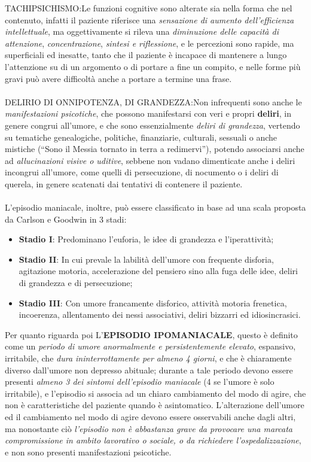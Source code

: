 \begin{itemize}
TACHIPSICHISMO:Le funzioni cognitive sono alterate sia nella forma che
nel contenuto, infatti il paziente riferisce una \emph{sensazione di
aumento dell'efficienza intellettuale}, ma oggettivamente si rileva una
\emph{diminuzione delle capacità di attenzione}, \emph{concentrazione},
\emph{sintesi e riflessione}, e le percezioni sono rapide, ma
superficiali ed inesatte, tanto che il paziente è incapace di mantenere
a lungo l'attenzione su di un argomento o di portare a fine un compito,
e nelle forme più gravi può avere difficoltà anche a portare a termine
una frase.
\\\\
DELIRIO DI ONNIPOTENZA, DI GRANDEZZA:Non infrequenti sono anche le
\emph{manifestazioni psicotiche}, che possono manifestarsi con veri e
propri \textbf{deliri}, in genere congrui all'umore, e che sono
essenzialmente \emph{deliri di grandezza}, vertendo su tematiche
genealogiche, politiche, finanziarie, culturali, sessuali o anche
mistiche (``Sono il Messia tornato in terra a redimervi''), potendo
associarsi anche ad \emph{allucinazioni visive o uditive}, sebbene non
vadano dimenticate anche i deliri incongrui all'umore, come quelli di
persecuzione, di nocumento o i deliri di querela, in genere scatenati
dai tentativi di contenere il paziente.
\\\\
L'episodio maniacale, inoltre, può essere classificato in base ad una
scala proposta da Carlson e Goodwin in 3 stadi:

\begin{itemize}
\item \textbf{Stadio I}: Predominano l'euforia, le idee di grandezza e l'iperattività;

\item \textbf{Stadio II}: In cui prevale la labilità dell'umore con frequente
disforia, agitazione motoria, accelerazione del pensiero sino alla fuga
delle idee, deliri di grandezza e di persecuzione;

\item \textbf{Stadio III}: Con umore francamente disforico, attività motoria
frenetica, incoerenza, allentamento dei nessi associativi, deliri
bizzarri ed idiosincrasici.
\end{itemize}

  Per quanto riguarda poi L'\textbf{EPISODIO IPOMANIACALE}, questo è
  definito come un \emph{periodo di umore anormalmente e
  persistentemente elevato}, espansivo, irritabile, che \emph{dura
  ininterrottamente per almeno 4 giorni}, e che è chiaramente diverso
  dall'umore non depresso abituale; durante a tale periodo devono essere
  presenti \emph{almeno 3 dei sintomi dell'episodio maniacale} (4 se
  l'umore è solo irritabile), e l'episodio si associa ad un chiaro
  cambiamento del modo di agire, che non è caratteristiche del paziente
  quando è asintomatico. L'alterazione dell'umore ed il cambiamento nel
  modo di agire devono essere osservabili anche dagli altri, ma
  nonostante ciò \emph{l'episodio non è abbastanza grave da provocare
  una marcata compromissione in ambito lavorativo o sociale, o da
  richiedere l'ospedalizzazione}, e non sono presenti manifestazioni
  psicotiche.


\end{itemize}
